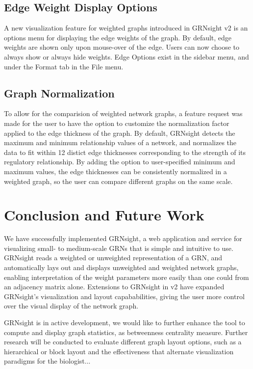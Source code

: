 \documentclass[sigconf,review,anonymous]{acmart}
\begin{document}
\subsection{Edge Weight Display Options}
A new visualization feature for weighted graphs introduced in GRNsight v2 is an options menu for displaying the edge weights of the graph. By default, edge weights are shown only upon mouse-over of the edge. Users can now choose to always show or always hide weights. Edge Options exist in the sidebar menu, and under the Format tab in the File menu.

\subsection{Graph Normalization}
To allow for the comparision of weighted network graphs, a feature request was made for the user to have the option to customize the normalization factor applied to the edge thickness of the graph. By default, GRNsight detects the maximum and minimum relationship values of a network, and normalizes the data to fit within 12 distict edge thicknesses corresponding to the strength of its regulatory relationship. By adding the option to user-specified minimum and maximum values, the edge thicknesses can be consistently normalized in a weighted graph, so the user can compare different graphs on the same scale. 

\section{Conclusion and Future Work}
We have successfully implemented GRNsight, a web application and service for visualizing small- to medium-scale GRNs that is simple and intuitive to use. GRNsight reads a weighted or unweighted representation of a GRN, and automatically lays out and displays unweighted and weighted network graphs, enabling interpretation of the weight parameters more easily than one could from an adjacency matrix alone. Extensions to GRNsight in v2 have expanded GRNsight's visualization and layout capababilities, giving the user more control over the visual display of the network graph.

GRNsight is in active development, we would like to further enhance the tool to compute and display graph statistics, as betweenness centrality measure. Further research will be conducted to evaluate different graph layout options, such as a hierarchical or block layout and the effectiveness that alternate visualization paradigms for the biologist...


 
\end{document}
